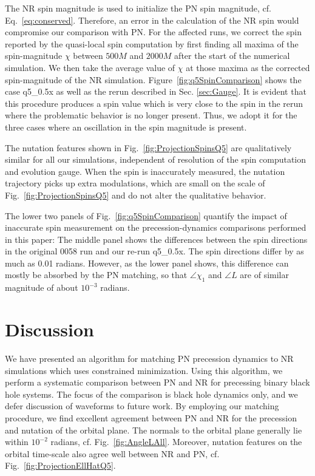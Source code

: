 \documentclass[aps,prd,amsmath,floatfix,twocolumn,superscriptaddress,nofootinbib,showpacs]{revtex4-1}
\begin{document}
The NR spin magnitude is used to initialize the PN spin magnitude,
cf. Eq.~\eqref{eq:conserved}.  Therefore, an error in the calculation
of the NR spin would compromise our comparison with PN.  For the
affected runs, we correct the spin reported by the quasi-local spin
computation by first finding all maxima of the spin-magnitude $\chi$
between $500M$ and $2000M$ after the start of the numerical
simulation.  We then take the average value of $\chi$ at those maxima
as the corrected spin-magnitude of the NR simulation.
Figure~\ref{fig:q5SpinComparison} shows the case q5\_0.5x as well as
the rerun described in Sec. \ref{sec:Gauge}. It is evident that this
procedure produces a spin value which is very close to the spin in the
rerun where the problematic behavior is no longer present. Thus, we
adopt it for the three cases where an oscillation in the spin
magnitude is present.

The nutation features shown in Fig.~\ref{fig:ProjectionSpinsQ5} are
qualitatively similar for all our simulations, independent of
resolution of the spin computation and evolution gauge.  When the spin
is inaccurately measured, the nutation trajectory picks up extra
modulations, which are small on the scale of
Fig.~\ref{fig:ProjectionSpinsQ5} and do not alter the qualitative
behavior.

The lower two panels of Fig.~\ref{fig:q5SpinComparison} quantify the
impact of inaccurate spin measurement on the precession-dynamics
comparisons performed in this paper: The middle panel shows the
differences between the spin directions in the original 0058 run and
our re-run q5\_0.5x.  The spin directions differ by as much as 0.01
radians.  However, as the lower panel shows, this difference can
mostly be absorbed by the PN matching, so that $\angle\chi_1$ and
$\angle L$ are of similar magnitude of about $10^{-3}$ radians.




\section{Discussion}
\label{sec:discussion}

We have presented an algorithm for matching PN precession dynamics to
NR simulations which uses constrained minimization.  Using this
algorithm, we perform a systematic comparison between PN and NR for
precessing binary black hole systems. The focus of the comparison is
black hole dynamics only, and we defer discussion of waveforms to
future work. By employing our matching procedure, we find excellent
agreement between PN and NR for the precession and nutation of the
orbital plane. The normals to the orbital plane generally lie within
$10^{-2}$ radians, cf. Fig.~\ref{fig:AngleLAll}. Moreover, nutation
features on the orbital time-scale also agree well between NR and PN,
cf. Fig.~\ref{fig:ProjectionEllHatQ5}.%
\end{document}
